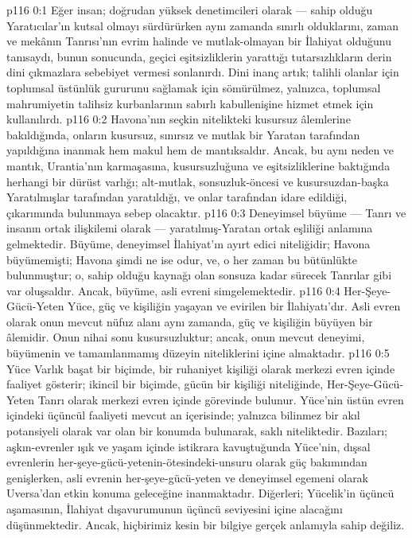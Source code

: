 \vs p116 0:1 Eğer insan; doğrudan yüksek denetimcileri olarak --- sahip olduğu Yaratıcılar’ın kutsal olmayı sürdürürken aynı zamanda sınırlı olduklarını, zaman ve mekânın Tanrısı’nın evrim halinde ve mutlak\hyp{}olmayan bir İlahiyat olduğunu tanısaydı, bunun sonucunda, geçici eşitsizliklerin yarattığı tutarsızlıkların derin dini çıkmazlara sebebiyet vermesi sonlanırdı. Dini inanç artık; talihli olanlar için toplumsal üstünlük gururunu sağlamak için sömürülmez, yalnızca, toplumsal mahrumiyetin talihsiz kurbanlarının sabırlı kabullenişine hizmet etmek için kullanılırdı.
\vs p116 0:2 Havona’nın seçkin nitelikteki kusursuz âlemlerine bakıldığında, onların kusursuz, sınırsız ve mutlak bir Yaratan tarafından yapıldığına inanmak hem makul hem de mantıksaldır. Ancak, bu aynı neden ve mantık, Urantia’nın karmaşasına, kusursuzluğuna ve eşitsizliklerine baktığında herhangi bir dürüst varlığı; alt\hyp{}mutlak, sonsuzluk\hyp{}öncesi ve kusursuzdan\hyp{}başka Yaratılmışlar tarafından yaratıldığı, ve onlar tarafından idare edildiği, çıkarımında bulunmaya sebep olacaktır.
\vs p116 0:3 Deneyimsel büyüme --- Tanrı ve insanın ortak ilişkilemi olarak --- yaratılmış\hyp{}Yaratan ortak eşliliği anlamına gelmektedir. Büyüme, deneyimsel İlahiyat’ın ayırt edici niteliğidir; Havona büyümemişti; Havona şimdi ne ise odur, ve, o her zaman bu bütünlükte bulunmuştur; o, sahip olduğu kaynağı olan sonsuza kadar sürecek Tanrılar gibi var oluşsaldır. Ancak, büyüme, asli evreni simgelemektedir.
\vs p116 0:4 Her\hyp{}Şeye\hyp{}Gücü\hyp{}Yeten Yüce, güç ve kişiliğin yaşayan ve evirilen bir İlahiyatı’dır. Asli evren olarak onun mevcut nüfuz alanı aynı zamanda, güç ve kişiliğin büyüyen bir âlemidir. Onun nihai sonu kusursuzluktur; ancak, onun mevcut deneyimi, büyümenin ve tamamlanmamış düzeyin niteliklerini içine almaktadır.
\vs p116 0:5 Yüce Varlık başat bir biçimde, bir ruhaniyet kişiliği olarak merkezi evren içinde faaliyet gösterir; ikincil bir biçimde, gücün bir kişiliği niteliğinde, Her\hyp{}Şeye\hyp{}Gücü\hyp{}Yeten Tanrı olarak merkezi evren içinde görevinde bulunur. Yüce’nin üstün evren içindeki üçüncül faaliyeti mevcut an içerisinde; yalnızca bilinmez bir akıl potansiyeli olarak var olan bir konumda bulunarak, saklı niteliktedir. Bazıları; aşkın\hyp{}evrenler ışık ve yaşam içinde istikrara kavuştuğunda Yüce’nin, dışsal evrenlerin her\hyp{}şeye\hyp{}gücü\hyp{}yetenin\hyp{}ötesindeki\hyp{}unsuru olarak güç bakımından genişlerken, asli evrenin her\hyp{}şeye\hyp{}gücü\hyp{}yeten ve deneyimsel egemeni olarak Uversa’dan etkin konuma geleceğine inanmaktadır. Diğerleri; Yücelik’in üçüncü aşamasının, İlahiyat dışavurumunun üçüncü seviyesini içine alacağını düşünmektedir. Ancak, hiçbirimiz kesin bir bilgiye gerçek anlamıyla sahip değiliz.
